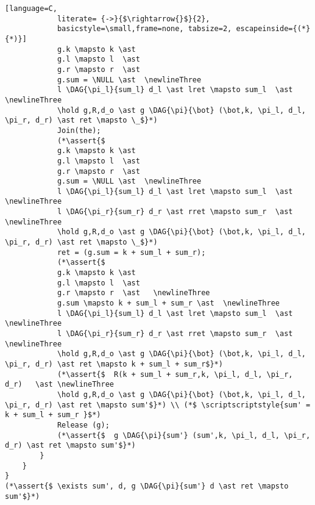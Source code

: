 \documentclass[8pt]{article}
\newcommand{\hold}{\text{Hold }}
\newcommand{\assert}[1]{\textcolor{blue}{ \{ #1 \}  } }
\newcommand{\NULL}{\text{NULL }}
\newcommand{\newlineThree}{\newline \hphantom{100pt}\hphantom{100pt}}
\newcommand{\DAG}[2]{ \underset{#2}{\overset{#1}{\dag}} }
\begin{document}
\begin{lstlisting}[language=C,
			literate= {->}{$\rightarrow{}$}{2},
			basicstyle=\small,frame=none, tabsize=2, escapeinside={(*}{*)}]
			g.k \mapsto k \ast
			g.l \mapsto l  \ast
			g.r \mapsto r  \ast
			g.sum = \NULL \ast  \newlineThree
			l \DAG{\pi_l}{sum_l} d_l \ast lret \mapsto sum_l  \ast \newlineThree
			\hold g,R,d_o \ast g \DAG{\pi}{\bot} (\bot,k, \pi_l, d_l, \pi_r, d_r) \ast ret \mapsto \_$}*)
			Join(the);
			(*\assert{$
			g.k \mapsto k \ast
			g.l \mapsto l  \ast
			g.r \mapsto r  \ast
			g.sum = \NULL \ast  \newlineThree
			l \DAG{\pi_l}{sum_l} d_l \ast lret \mapsto sum_l  \ast \newlineThree
			l \DAG{\pi_r}{sum_r} d_r \ast rret \mapsto sum_r  \ast \newlineThree
			\hold g,R,d_o \ast g \DAG{\pi}{\bot} (\bot,k, \pi_l, d_l, \pi_r, d_r) \ast ret \mapsto \_$}*)
			ret = (g.sum = k + sum_l + sum_r);
			(*\assert{$
			g.k \mapsto k \ast
			g.l \mapsto l  \ast
			g.r \mapsto r  \ast   \newlineThree
			g.sum \mapsto k + sum_l + sum_r \ast  \newlineThree
			l \DAG{\pi_l}{sum_l} d_l \ast lret \mapsto sum_l  \ast \newlineThree
			l \DAG{\pi_r}{sum_r} d_r \ast rret \mapsto sum_r  \ast \newlineThree
			\hold g,R,d_o \ast g \DAG{\pi}{\bot} (\bot,k, \pi_l, d_l, \pi_r, d_r) \ast ret \mapsto k + sum_l + sum_r$}*)
			(*\assert{$  R(k + sum_l + sum_r,k, \pi_l, d_l, \pi_r, d_r)   \ast \newlineThree
			\hold g,R,d_o \ast g \DAG{\pi}{\bot} (\bot,k, \pi_l, d_l, \pi_r, d_r) \ast ret \mapsto sum'$}*) \\ (*$ \scriptscriptstyle{sum' = k + sum_l + sum_r }$*)
			Release (g);
			(*\assert{$  g \DAG{\pi}{sum'} (sum',k, \pi_l, d_l, \pi_r, d_r) \ast ret \mapsto sum'$}*)
		}
	}
}		
(*\assert{$ \exists sum', d, g \DAG{\pi}{sum'} d \ast ret \mapsto sum'$}*)

\end{lstlisting}

	
\end{document}
